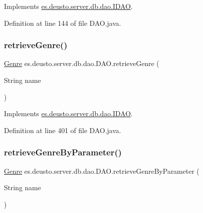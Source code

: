 Implements \hyperlink{interfacees_1_1deusto_1_1server_1_1db_1_1dao_1_1_i_d_a_o_a5189543a4a8e9e3bed8df7d452db283a}{es.\+deusto.\+server.\+db.\+dao.\+I\+D\+AO}.



Definition at line 144 of file D\+A\+O.\+java.

\mbox{\label{classes_1_1deusto_1_1server_1_1db_1_1dao_1_1_d_a_o_a16b0af798fbb00cd29a505491c57e2cd}} 
\subsubsection{\texorpdfstring{retrieve\+Genre()}{retrieveGenre()}}
{\footnotesize\ttfamily \hyperlink{classes_1_1deusto_1_1server_1_1db_1_1data_1_1_genre}{Genre} es.\+deusto.\+server.\+db.\+dao.\+D\+A\+O.\+retrieve\+Genre (\begin{DoxyParamCaption}\item[{String}]{name }\end{DoxyParamCaption})}



Implements \hyperlink{interfacees_1_1deusto_1_1server_1_1db_1_1dao_1_1_i_d_a_o_a8b15955637f9b81c57900761c6d03571}{es.\+deusto.\+server.\+db.\+dao.\+I\+D\+AO}.



Definition at line 401 of file D\+A\+O.\+java.

\mbox{\label{classes_1_1deusto_1_1server_1_1db_1_1dao_1_1_d_a_o_a1442de50d193b561a382edcac5837660}} 
\subsubsection{\texorpdfstring{retrieve\+Genre\+By\+Parameter()}{retrieveGenreByParameter()}}
{\footnotesize\ttfamily \hyperlink{classes_1_1deusto_1_1server_1_1db_1_1data_1_1_genre}{Genre} es.\+deusto.\+server.\+db.\+dao.\+D\+A\+O.\+retrieve\+Genre\+By\+Parameter (\begin{DoxyParamCaption}\item[{String}]{name }\end{DoxyParamCaption})}



